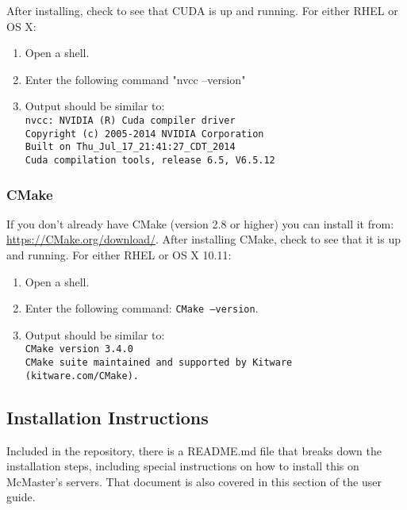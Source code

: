\documentclass[12pt]{article}
\begin{document}
After installing, check to see that CUDA is up and running. For either RHEL or OS X:
\begin{enumerate}
\item Open a shell.
\item Enter the following command "nvcc --version"
\item Output should be similar to:\\
\texttt{nvcc: NVIDIA (R) Cuda compiler driver}\\
\texttt{Copyright (c) 2005-2014 NVIDIA Corporation}\\
\texttt{Built on Thu\_Jul\_17\_21:41:27\_CDT\_2014}\\
\texttt{Cuda compilation tools, release 6.5, V6.5.12}\\
\end{enumerate}


\subsubsection{CMake}
If you don't already have CMake (version 2.8 or higher) you can install it from: \url{https://CMake.org/download/}. After installing CMake, check to see that it is up and running. For either RHEL or OS X 10.11:
\begin{enumerate}
\item Open a shell.
\item Enter the following command: \texttt{CMake --version}.
\item Output should be similar to:\\
\texttt{CMake version 3.4.0}\\
\texttt{CMake suite maintained and supported by Kitware (kitware.com/CMake).}
\end{enumerate}

\subsection{Installation Instructions} %
Included in the repository, there is a README.md file that breaks down the installation steps, including special instructions on how to install this on McMaster's servers. That document is also covered in this section of the user guide.
\end{document}
